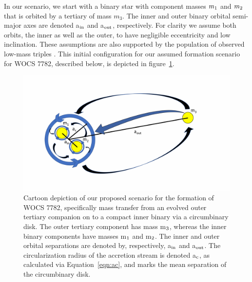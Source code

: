 \documentclass[twocolumn]{aastex62}
\begin{document}
In our scenario, we start with a binary star with component masses
$m_{\rm 1}$ and $m_{\rm 2}$ that is orbited by a tertiary of mass
$m_3$. The inner and outer binary orbital semi-major axes are denoted
a$_{\rm in}$ and a$_{\rm out}$, respectively.  For clarity we 
assume both orbits, the inner as well as the outer, to have negligible
eccentricity and low inclination.  These assumptions are also
supported by the population of observed low-mass triples
\citep{2010yCat..73890925T,2018ApJ...854...44M}.  This initial configuration for our
assumed formation scenario for WOCS 7782, described below, is
depicted in figure~\ref{fig:fig1}.

\begin{figure}[ht!]
\includegraphics[width=\columnwidth]{fig_doodle.pdf}
\caption{Cartoon depiction of our proposed scenario for the formation
  of WOCS 7782, specifically mass transfer from an evolved outer
  tertiary companion on to a compact inner binary via a circumbinary
  disk.  The outer tertiary component has mass m$_{\rm 3}$, whereas
  the inner binary components have masses m$_{\rm 1}$ and m$_{\rm 2}$.
  The inner and outer orbital separations are denoted by,
  respectively, a$_{\rm in}$ and a$_{\rm out}$.  The circularization
  radius of the accretion stream is denoted a$_{\rm c}$, as calculated
  via Equation~\ref{eqn:ac}, and marks the mean separation of the
  circumbinary disk.
\label{fig:fig1}}
\end{figure}
\end{document}

